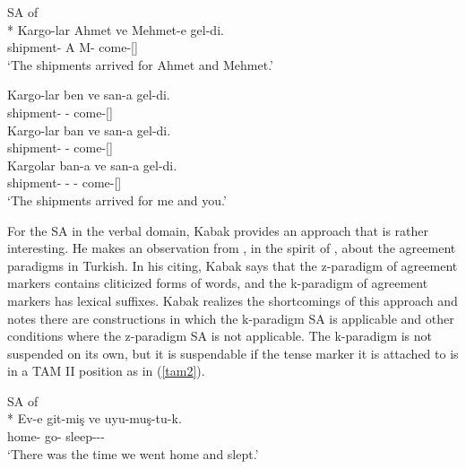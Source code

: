 \begin{exe}
\ex \label{kabakphonology}
\begin{xlist}
\ex SA of {\Dat} \\*
\gll Kargo-lar Ahmet ve Mehmet-e gel-di. \\ 
shipment-{\Pl} A {\And} M-{\Dat} come-{\Pst}[{\Tsg}] \\
\glt `The shipments arrived for Ahmet and Mehmet.'

\ex \gll *Kargo-lar ben ve san-a gel-di. \\ 
shipment-{\Pl} {\Fsg} {\And} {\Ssg}-{\Dat} come-{\Pst}[{\Tsg}] \\

\ex \gll *Kargo-lar ban ve san-a gel-di. \\ 
shipment-{\Pl} {\Fsg} {\And} {\Ssg}-{\Dat} come-{\Pst}[{\Tsg}] \\

\ex \gll 
Kargolar ban-a ve san-a gel-di. \\ 
shipment-{\Pl} {\Fsg}-{\Dat} {\And} {\Ssg}-{\Dat} come-{\Pst}[{\Tsg}] \\
\glt `The shipments arrived for me and you.'
\end{xlist}
\end{exe}


For the SA in the verbal domain, Kabak provides an approach that is rather interesting. He makes an observation from \citet{good2005morphosyntax}, in the spirit of \citet{erdal2000clitics}, about the agreement paradigms in Turkish. In his citing, Kabak says that the z-paradigm of agreement markers contains cliticized forms of words, and the k-paradigm of agreement markers has lexical suffixes. Kabak realizes the shortcomings of this approach and notes there are constructions in which the k-paradigm SA is applicable and other conditions where the z-paradigm SA is not applicable. The k-paradigm is not suspended on its own, but it is suspendable if the tense marker it is attached to is in a TAM II position as in (\ref{tam2}).

\begin{exe}
\ex \label{tam2} SA of {\Fpl}\\*
\gll Ev-e git-miş ve uyu-muş-tu-k. \\ 
home-{\Dat} go-{\Evi} {\And} sleep-{\Evi}-{\Pst}-{\Fpl} \\
\glt `There was the time we went home and slept.'
\end{exe}

